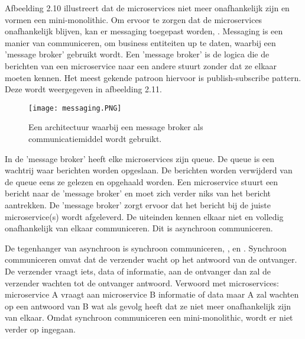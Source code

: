 Afbeelding 2.10 illustreert dat de microservices niet meer onafhankelijk zijn en vormen een mini-monolithic. Om ervoor te zorgen dat de microservices onafhankelijk blijven, kan er messaging toegepast worden, \textcite{Solance2018}. Messaging is een manier van communiceren, om business entiteiten up te daten, waarbij een 'message broker' gebruikt wordt. Een 'message broker' is de logica die de berichten van een microservice naar een andere stuurt zonder dat ze elkaar moeten kennen. Het meest gekende patroon hiervoor is publish-subscribe pattern. Deze wordt weergegeven in afbeelding 2.11.
\begin{figure}[h!]
	\texttt{[image: messaging.PNG]}
	\centering
	\caption{Een architectuur waarbij een message broker als communicatiemiddel wordt gebruikt.}
\end{figure}
In de 'message broker' heeft elke microservices zijn queue. De queue is een wachtrij waar berichten worden opgeslaan. De berichten worden verwijderd van de queue eens ze gelezen en opgehaald worden. 
Een microservice stuurt een bericht naar de 'message broker' en moet zich verder niks van het bericht aantrekken. De 'message broker' zorgt ervoor dat het bericht bij de juiste microservice(s) wordt afgeleverd. De uiteinden kennen elkaar niet en volledig onafhankelijk van elkaar communiceren.
Dit is asynchroon communiceren.

De tegenhanger van asynchroon is synchroon communiceren, \textcite{Gupta2018}, \textcite{Jackson2016} en \textcite{Shore2016}.
Synchroon communiceren omvat dat de verzender wacht op het antwoord van de ontvanger. De verzender vraagt iets, data of informatie, aan de ontvanger dan zal de verzender wachten tot de ontvanger antwoord. Verwoord met microservices: microservice A vraagt aan microservice B informatie of data maar A zal wachten op een antwoord van B wat als gevolg heeft dat ze niet meer onafhankelijk zijn van elkaar. Omdat synchroon communiceren een mini-monolithic, wordt er niet verder op ingegaan.

